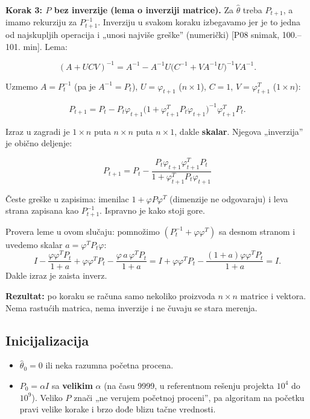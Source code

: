 \documentclass[11pt,a4paper,parskip=half,headsepline,numbers=noenddot]{scrartcl}
\DeclareRobustCommand{\izvor}[1]{{\small\color{izvorC}[#1]}}
\begin{document}
\textbf{Korak 3: \(P\) bez inverzije (lema o inverziji matrice).} Za \(\hat\theta\) treba \(P_{t+1}\), a imamo rekurziju za \(P_{t+1}^{-1}\). Inverziju u svakom koraku izbegavamo jer je to jedna od najskupljih operacija i „unosi najviše greške'' (numerički) \izvor{P08 snimak, 100.--101. min}. Lema:

\[(A + UCV)^{-1} = A^{-1} - A^{-1}U\big(C^{-1} + VA^{-1}U\big)^{-1}VA^{-1} .\]

Uzmemo \(A = P_t^{-1}\) (pa je \(A^{-1} = P_t\)), \(U = \varphi_{t+1}\) (\(n\times 1\)), \(C = 1\), \(V = \varphi_{t+1}^T\) (\(1\times n\)):

\[P_{t+1} = P_t - P_t\varphi_{t+1}\big(1 + \varphi_{t+1}^TP_t\varphi_{t+1}\big)^{-1}\varphi_{t+1}^TP_t .\]

Izraz u zagradi je \(1\times n\) puta \(n\times n\) puta \(n\times 1\), dakle \textbf{skalar}. Njegova „inverzija'' je obično deljenje:

\[P_{t+1} = P_t - \frac{P_t\varphi_{t+1}\varphi_{t+1}^TP_t}{1 + \varphi_{t+1}^TP_t\varphi_{t+1}}\]

Česte greške u zapisima: imenilac \(1 + \varphi P\varphi^T\) (dimenzije ne odgovaraju) i leva strana zapisana kao \(P_{t+1}^{-1}\). Ispravno je kako stoji gore.

\begin{zasto}
Provera leme u ovom slučaju: pomnožimo \((P_t^{-1} + \varphi\varphi^T)\) sa desnom stranom i uvedemo skalar \(a = \varphi^TP_t\varphi\):
\[I - \frac{\varphi\varphi^TP_t}{1+a} + \varphi\varphi^TP_t - \frac{\varphi\,a\,\varphi^TP_t}{1+a} = I + \varphi\varphi^TP_t - \frac{(1+a)\varphi\varphi^TP_t}{1+a} = I .\]
Dakle izraz je zaista inverz.
\end{zasto}

\textbf{Rezultat:} po koraku se računa samo nekoliko proizvoda \(n\times n\) matrice i vektora. Nema rastućih matrica, nema inverzije i ne čuvaju se stara merenja.

\subsection{Inicijalizacija}

\begin{itemize}
\item \(\hat\theta_0 = 0\) ili neka razumna početna procena.
\item \(P_0 = \alpha I\) sa \textbf{velikim} \(\alpha\) (na času 9999, u referentnom rešenju projekta \(10^4\) do \(10^9\)). Veliko \(P\) znači „ne verujem početnoj proceni'', pa algoritam na početku pravi velike korake i brzo dođe blizu tačne vrednosti.
\end{itemize}
\end{document}
